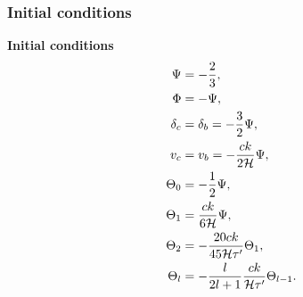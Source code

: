 \subsubsection{Initial conditions}

    \begin{tcolorbox}[
        width=1.025\linewidth,
        colback=blue!5!white,
        colframe=white
    ]
    \textbf{Initial conditions}
    \begin{subequations}\label{eq:m3:theory:initial_conditions}
        \begin{align}
            \Psi &= -\frac{2}{3}, \label{eq:m3:theory:initial_conditions_Psi}\\
            \Phi &= -\Psi, \label{eq:m3:theory:initial_conditions_Phi}\\
            \delta_c &= \delta_b = -\frac{3}{2}\Psi, \label{eq:m3:theory:initial_conditions_deltas}\\
            v_c &= v_b = -\frac{ck}{2\mathcal{H}}\Psi, \label{eq:m3:theory:initial_conditions_vs}\\ 
            \Theta_0 &= -\frac{1}{2}\Psi, \label{eq:m3:theory:initial_conditions_monopole}\\
            \Theta_1 &= \frac{ck}{6\mathcal{H}}\Psi, \label{eq:m3:theory:initial_conditions_dipole}\\
            \Theta_2 &= -\frac{20ck}{45\mathcal{H}\tau'}\Theta_1, \label{eq:m3:theory:initial_conditions_quadrapole}\\
            \Theta_l &= -\frac{l}{2l+1}\frac{ck}{\mathcal{H}\tau'}\Theta_{l-1}.\label{eq:m3:theory:initial_conditions_multipoles}
        \end{align}
    \end{subequations}
    \end{tcolorbox}
